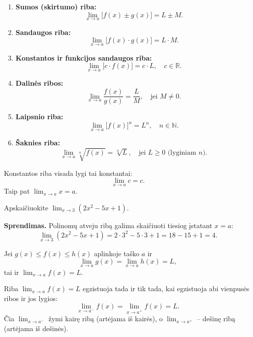 \begin{theorem}
\leavevmode
\begin{enumerate}[label=\arabic*.]
  \item \textbf{Sumos (skirtumo) riba:}
  \[
    \lim_{x \to a} \bigl[f(x) \pm g(x)\bigr] = L \pm M.
  \]

  \item \textbf{Sandaugos riba:}
  \[
    \lim_{x \to a} \bigl[f(x) \cdot g(x)\bigr] = L \cdot M.
  \]

  \item \textbf{Konstantos ir funkcijos sandaugos riba:}
  \[
    \lim_{x \to a} \bigl[c \cdot f(x)\bigr] = c \cdot L, \quad c \in \mathbb{R}.
  \]

  \item \textbf{Dalinės ribos:}
  \[
    \lim_{x \to a} \frac{f(x)}{g(x)} = \frac{L}{M}, \quad \text{jei } M \neq 0.
  \]

  \item \textbf{Laipsnio riba:}
  \[
    \lim_{x \to a} \bigl[f(x)\bigr]^n = L^n, \quad n \in \mathbb{N}.
  \]

  \item \textbf{Šaknies riba:}
  \[
    \lim_{x \to a} \sqrt[n]{f(x)} = \sqrt[n]{L}, \quad \text{jei } L \geq 0 \text{ (lyginiam } n\text{)}.
  \]
\end{enumerate}
\end{theorem}

\begin{remark}
Konstantos riba visada lygi tai konstantai:
\[
  \lim_{x \to a} c = c.
\]
Taip pat $\lim_{x \to a} x = a$.
\end{remark}

\begin{example}
Apskaičiuokite $\lim_{x \to 3}(2x^2 - 5x + 1)$.

\textbf{Sprendimas.} Polinomų atveju ribą galima skaičiuoti tiesiog įstatant $x = a$:
\[
  \lim_{x \to 3}(2x^2 - 5x + 1) = 2 \cdot 3^2 - 5 \cdot 3 + 1 = 18 - 15 + 1 = 4.
\]
\end{example}

\begin{theorem}
Jei $g(x) \leq f(x) \leq h(x)$ aplinkoje taško $a$ ir
\[
  \lim_{x \to a} g(x) = \lim_{x \to a} h(x) = L,
\]
tai ir $\lim_{x \to a} f(x) = L$.
\end{theorem}

\begin{theorem}
Riba $\lim_{x \to a} f(x) = L$ egzistuoja tada ir tik tada, kai egzistuoja abi vienpusės ribos
ir jos lygios:
\[
  \lim_{x \to a^-} f(x) = \lim_{x \to a^+} f(x) = L.
\]
Čia $\lim_{x \to a^-}$ žymi kairę ribą (artėjama iš kairės), o $\lim_{x \to a^+}$ -- dešinę
ribą (artėjama iš dešinės).
\end{theorem}

